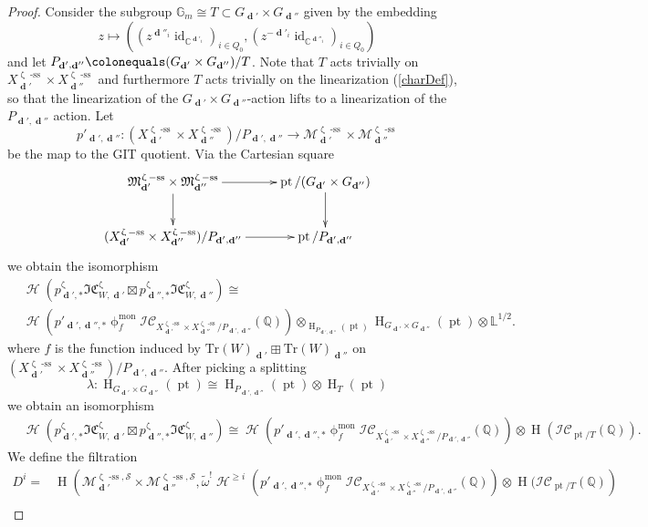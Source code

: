\documentclass[a4paper,10pt]{amsart}
\renewcommand{\zeta}{\upzeta}
\renewcommand{\phi}{\upphi}
\newcommand{\GG}{\mathbb{G}}
\newcommand{\LL}{\mathbb{L}}
\newcommand{\SP}{\mathcal{S}}
\newcommand{\W}{\mathrm{Tr}(W)}
\newcommand{\Mst}{\mathfrak{M}}
\newcommand{\Msp}{\mathcal{M}}
\newcommand{\ICS}{\mathcal{IC}}
\newcommand{\ICSt}{\mathfrak{IC}}
\newcommand{\phim}[1]{\phi^{\mon}_{#1}}
\DeclareMathOperator{\sst}{-ss}
\DeclareMathOperator{\mon}{mon}
\DeclareMathOperator{\dd}{\mathbf{d}}
\DeclareMathOperator{\id}{id}
\DeclareMathOperator{\pt}{pt}
\DeclareMathOperator{\Ho}{\mathcal{H}}
\DeclareMathOperator{\HO}{H}
\begin{document}
\begin{proof}
Consider the subgroup $\GG_m\cong T\subset G_{\dd'}\times G_{\dd''}$ given by the embedding 
\[
z\mapsto \left( (z^{\dd''_i}\id_{\mathbb{C}^{\dd'_i}})_{i\in Q_0},(z^{-\dd'_i}\id_{\mathbb{C}^{\dd''_i}})_{i\in Q_0}\right)
\]
and let $P_{\dd',\dd''}\colonequals (G_{\dd'}\times G_{\dd''})/T$.  Note that $T$ acts trivially on $X^{\zeta\sst}_{\dd'}\times X^{\zeta\sst}_{\dd''}$ and furthermore $T$ acts trivially on the linearization (\ref{charDef}), so that the linearization of the $G_{\dd'}\times G_{\dd''}$-action lifts to a linearization of the $P_{\dd',\dd''}$ action.  Let 
\[
p'_{\dd',\dd''}\colon (X^{\zeta\sst}_{\dd'}\times X^{\zeta\sst}_{\dd''})/P_{\dd',\dd''}\rightarrow \Msp_{\dd'}^{\zeta\sst}\times \Msp_{\dd''}^{\zeta\sst}
\]
be the map to the GIT quotient.  Via the Cartesian square
\[
\xymatrix{
\Mst_{\dd'}^{\zeta\sst}\times \Mst_{\dd''}^{\zeta\sst}\ar[r]\ar[d]&\pt/(G_{\dd'}\times G_{\dd''})\ar[d]\\
(X^{\zeta\sst}_{\dd'}\times X^{\zeta\sst}_{\dd''})/P_{\dd',\dd''}\ar[r]&\pt/P_{\dd',\dd''}
}
\]
we obtain the isomorphism 
\begin{align*}
&\Ho\left(p^{\zeta}_{\dd',*}\ICSt_{W,\dd'}^{\zeta}\boxtimes p^{\zeta}_{\dd'',*}\ICSt_{W,\dd''}^{\zeta}\right)\cong\\& \Ho\left(p'_{\dd',\dd'',*}\phim{f}\ICS_{X^{\zeta\sst}_{\dd'}\times X^{\zeta\sst}_{\dd''}/P_{\dd',\dd''}}(\mathbb{Q})\right)\otimes_{\HO_{P_{\dd',\dd''}}(\pt)}\HO_{G_{\dd'}\times G_{\dd''}}(\pt)\otimes \LL^{1/2}.
\end{align*}
where $f$ is the function induced by $\W_{\dd'}\boxplus \W_{\dd''}$ on $(X^{\zeta\sst}_{\dd'}\times X^{\zeta\sst}_{\dd''})/P_{\dd',\dd''}$.  After picking a splitting
\[
\lambda\colon \HO_{G_{\dd'}\times G_{\dd''}}(\pt)\cong \HO_{P_{\dd',\dd''}}(\pt)\otimes \HO_{T}(\pt)
\]
we obtain an isomorphism
\begin{align*}
&\Ho\left(p^{\zeta}_{\dd',*}\ICSt_{W,\dd'}^{\zeta}\boxtimes p^{\zeta}_{\dd'',*}\ICSt_{W,\dd''}^{\zeta}\right)\cong \Ho\left(p'_{\dd',\dd'',*}\phim{f}\ICS_{X^{\zeta\sst}_{\dd'}\times X^{\zeta\sst}_{\dd''}/P_{\dd',\dd''}}(\mathbb{Q})\right)\otimes \HO(\ICS_{\pt/T}(\mathbb{Q})).
\end{align*}
We define the filtration
\begin{align*}
D^i=&\HO\left(\Msp_{\dd'}^{\zeta\sst,\SP}\times \Msp_{\dd''}^{\zeta\sst,\SP},\tilde{\omega}^!\Ho^{\geq i}\left(p'_{\dd',\dd'',*}\phim{f}\ICS_{X^{\zeta\sst}_{\dd'}\times X^{\zeta\sst}_{\dd''}/P_{\dd',\dd''}}(\mathbb{Q})\right)\otimes \HO(\ICS_{\pt/T}(\mathbb{Q})\right)\\&

\end{align*}
\end{proof}
\end{document}
